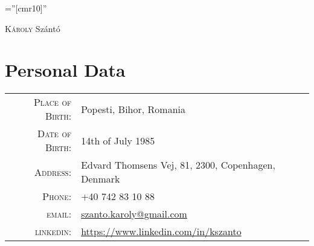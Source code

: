 \documentclass[a4paper,10pt]{article}
\begin{document}
\pagestyle{plain} %

\font\fb=''[cmr10]'' %

 
\par{\centering
		{\Huge \textsc{K\'aroly} Sz\'ant\'o
	}\bigskip\par}
	
\section{Personal Data}

\begin{tabular}{rl}
    \textsc{Place of Birth:} & Popesti, Bihor, Romania\\
    \textsc{Date of Birth:}  & 14th of July 1985 \\
    \textsc{Address:}         & Edvard Thomsens Vej, 81, 2300, Copenhagen, Denmark\\
    \textsc{Phone:}     	 & +40 742 83 10 88\\
    \textsc{email:}     	 &
    \href{mailto:szanto.karoly@gmail.com}{szanto.karoly@gmail.com}\\
    \textsc{linkedin:}     	 &     \href{https://www.linkedin.com/in/kszanto}{https://www.linkedin.com/in/kszanto}
\end{tabular}

\end{document}
